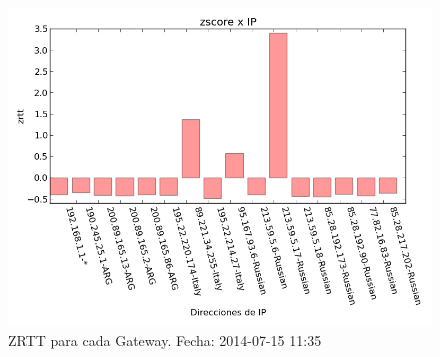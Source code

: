\begin{figure}[H]
	\begin{center}
		  \includegraphics[scale=0.5]{../graficos_informe/kamgu_zscore_segunda_medicion.png}
		  \caption{ZRTT para cada Gateway. Fecha: 2014-07-15 11:35}
		  \label{fig:contra1}
	\end{center}
\end{figure}




